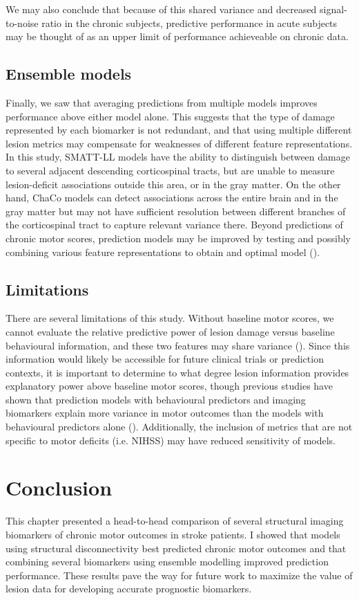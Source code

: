 \documentclass[phd,tocprelim]{cornell}
\begin{document}
We may also conclude that because of this shared variance and decreased signal-to-noise ratio in the chronic subjects, predictive performance in acute subjects may be thought of as an upper limit of performance achieveable on chronic data. 

\subsection{Ensemble models}
Finally, we saw that averaging predictions from multiple models improves performance above either model alone. This suggests that the type of damage represented by each biomarker is not redundant, and that using multiple different lesion metrics may compensate for weaknesses of different feature representations. In this study, SMATT-LL models have the ability to distinguish between damage to several adjacent descending corticospinal tracts, but are unable to measure lesion-deficit associations outside this area, or in the gray matter. On the other hand, ChaCo models can detect associations across the entire brain and in the gray matter but may not have sufficient resolution between different branches of the corticospinal tract to capture relevant variance there. Beyond predictions of chronic motor scores, prediction models may be improved by testing and possibly combining various feature representations to obtain and optimal model (\cite{Kasties2021-rm}).

\subsection{Limitations}
There are several limitations of this study. Without baseline motor scores, we cannot evaluate the relative predictive power of lesion damage versus baseline behavioural information, and these two features may share variance (\cite{Feng2015-du, Bowren2022-rs}). Since this information would likely be accessible for future clinical trials or prediction contexts, it is important to determine to what degree lesion information provides explanatory power above baseline motor scores, though previous studies have shown that prediction models with behavioural predictors and imaging biomarkers explain more variance in motor outcomes than the models with behavioural predictors alone (\cite{Kim2017-xe, Feng2015-du}). Additionally, the inclusion of metrics that are not specific to motor deficits (i.e. NIHSS) may have reduced sensitivity of models. 

\section{Conclusion}
This chapter presented a head-to-head comparison of several structural imaging biomarkers of chronic motor outcomes in stroke patients. I showed that models using structural disconnectivity best predicted chronic motor outcomes and that combining several biomarkers using ensemble modelling improved prediction performance. These results pave the way for future work to maximize the value of lesion data for developing accurate prognostic biomarkers.
\end{document}
